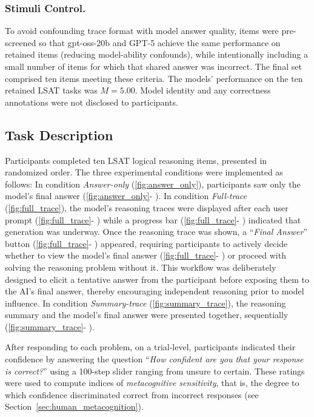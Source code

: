 \documentclass[manuscript, anonymous=false,authorversion,review=false]{acmart}
\newcommand{\blackcircled}[1]{%
  \tikz[baseline=(char.base)]{
    \node[circle,fill=black,text=white,inner sep=.5pt] (char) {\textbf{\sffamily #1}};
  }%
}
\begin{document}
\subsubsection{Stimuli Control.}\label{sec:stimuli_control}
To avoid confounding trace format with model answer quality, items were pre-screened so that gpt-oss-20b and GPT-5 achieve the same performance on retained items (reducing model-ability confounds), while intentionally including a small number of items for which that shared answer was incorrect. The final set comprised ten items meeting these criteria. The models' performance on the ten retained LSAT tasks was $M=5.00$. Model identity and any correctness annotations were not disclosed to participants.

\subsection{Task Description}\label{sec:task-description}

Participants completed ten LSAT logical reasoning items, presented in randomized order. The three experimental conditions were implemented as follows: In condition \textit{Answer-only} (\autoref{fig:answer_only}), participants saw only the model's final answer (\autoref{fig:answer_only}-\blackcircled{A}). In condition \textit{Full-trace} (\autoref{fig:full_trace}), the model's reasoning traces were displayed after each user prompt (\autoref{fig:full_trace}-\blackcircled{B}) while a progress bar (\autoref{fig:full_trace}-\blackcircled{E}) indicated that generation was underway. Once the reasoning trace was shown, a ``\textit{Final Answer}'' button (\autoref{fig:full_trace}-\blackcircled{C}) appeared, requiring participants to actively decide whether to view the model's final answer (\autoref{fig:full_trace}-\blackcircled{D}) or proceed with solving the reasoning problem without it. This workflow was deliberately designed to elicit a tentative answer from the participant before exposing them to the AI's final answer, thereby encouraging independent reasoning prior to model influence. In condition \textit{Summary-trace} (\autoref{fig:summary_trace}), the reasoning summary and the model's final answer were presented together, sequentially (\autoref{fig:summary_trace}-\blackcircled{G}).

After responding to each problem, on a trial-level, participants indicated their confidence by answering the question ``\textit{How confident are you that your response is correct?}'' using a 100-step slider ranging from unsure to certain. These ratings were used to compute indices of \textit{metacognitive sensitivity}, that is, the degree to which confidence discriminated correct from incorrect responses (see Section~\ref{sec:human_metacognition}).
\end{document}
